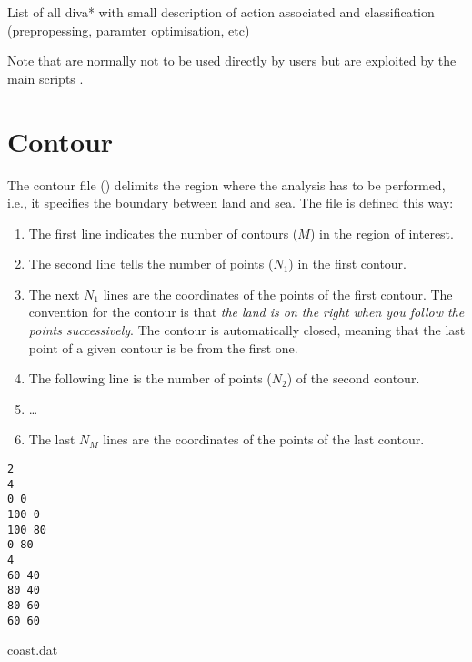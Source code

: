 List of all diva* with small description of action associated and classification (prepropessing, paramter optimisation,   etc)

Note that  are normally not to be used directly by users but are exploited by the main \diva scripts .





\section{Contour\label{contourdiva}}

The contour file () delimits the region where the analysis has to be performed, i.e., it specifies the boundary between land and sea. The file is defined this way:
\begin{enumerate}
\item The first line indicates the number of contours ($M$) in the region of interest.
\item The second line tells the number of points ($N_{1}$) in the first contour.
\item The next $N_1$ lines are the coordinates of the points of the first contour. The convention for the contour is that \textit{the land is on the right when you follow the points successively}. The contour is automatically closed, meaning that the last point of a given contour is be from the first one. 
\item The following line is the number of points ($N_{2}$) of the second contour.
\item \ldots
\item The last $N_M$ lines are the coordinates of the points of the last contour.
\end{enumerate}

\begin{exfile}[htpb]
\begin{footnotesize}
\texttt{2\\
4\\
0 0\\
100 0\\
100 80\\
0 80\\
4\\
60 40\\
80 40\\
80 60\\
60 60} 
\end{footnotesize}
\caption{coast.dat\label{ex:coast.dat}}
\end{exfile}

